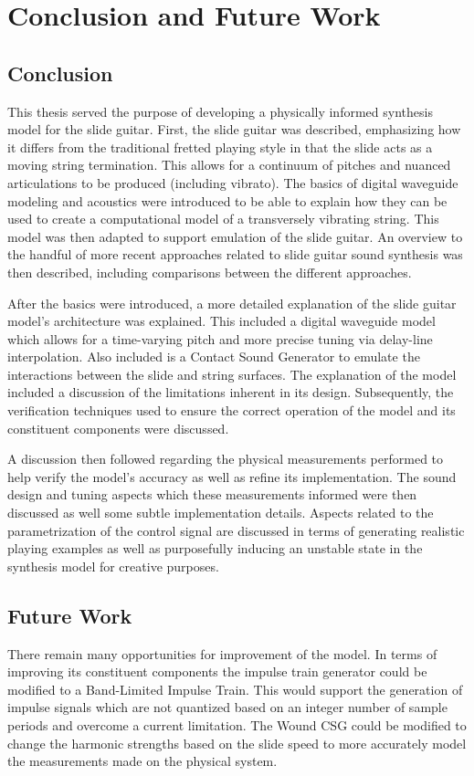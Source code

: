 \documentclass[../main.tex]{subfiles}
\begin{document}
\chapter{Conclusion and Future Work}

\section{Conclusion}
This thesis served the purpose of developing a physically informed synthesis model for the slide guitar. First, the slide guitar was described, emphasizing how it differs from the traditional fretted playing style in that the slide acts as a moving string termination. This allows for a continuum of pitches and nuanced articulations to be produced (including vibrato). The basics of digital waveguide modeling and acoustics were introduced to be able to explain how they can be used to create a computational model of a transversely vibrating string. This model was then adapted to support emulation of the slide guitar. An overview to the handful of more recent approaches related to slide guitar sound synthesis was then described, including comparisons between the different approaches.

After the basics were introduced, a more detailed explanation of the slide guitar model's architecture was explained. This included a digital waveguide model which allows for a time-varying pitch and more precise tuning via delay-line interpolation. Also included is a Contact Sound Generator to emulate the interactions between the slide and string surfaces. The explanation of the model included a discussion of the limitations inherent in its design. Subsequently, the verification techniques used to ensure the correct operation of the model and its constituent components were discussed.

A discussion then followed regarding the physical measurements performed to help verify the model's accuracy as well as refine its implementation. The sound design and tuning aspects which these measurements informed were then discussed as well some subtle implementation details. Aspects related to the parametrization of the control signal are discussed in terms of generating realistic playing examples as well as purposefully inducing an unstable state in the synthesis model for creative purposes.

\section{Future Work}
There remain many opportunities for improvement of the model. In terms of improving its constituent components the impulse train generator could be modified to a Band-Limited Impulse Train. This would support the generation of impulse signals which are not quantized based on an integer number of sample periods and overcome a current limitation. The Wound CSG could be modified to change the harmonic strengths based on the slide speed to more accurately model the measurements made on the physical system.
\end{document}

